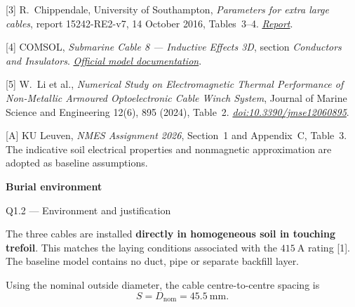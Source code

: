 \documentclass[11pt,a4paper]{article}
\newcommand{\source}[2]{\href{#1}{\textit{#2}}}
\begin{document}
[3] R.~Chippendale, University of Southampton, \textit{Parameters for extra large
cables}, report 15242-RE2-v7, 14 October 2016, Tables~3--4.
\source{https://www.transmissionexcel.com/wp-content/uploads/2016/11/Parameters-for-extra-large-cables-FINAL.pdf}{Report}.

[4] COMSOL, \textit{Submarine Cable 8 --- Inductive Effects 3D},
section \textit{Conductors and Insulators}.
\source{https://doc.comsol.com/6.4/doc/com.comsol.help.models.acdc.submarine_cable_08_inductive_effects_3d/submarine_cable_08_inductive_effects_3d.html}{Official model documentation}.

[5] W.~Li et al., \textit{Numerical Study on Electromagnetic Thermal Performance of
Non-Metallic Armoured Optoelectronic Cable Winch System},
Journal of Marine Science and Engineering 12(6), 895 (2024), Table~2.
\source{https://doi.org/10.3390/jmse12060895}{doi:10.3390/jmse12060895}.

[A] KU Leuven, \textit{NMES Assignment 2026}, Section~1 and Appendix~C, Table~3.
The indicative soil electrical properties and nonmagnetic approximation are
adopted as baseline assumptions.
\endgroup

\newpage
{\LARGE\bfseries Burial environment}\par
{\large Q1.2 --- Environment and justification}\par\medskip

The three cables are installed \textbf{directly in homogeneous soil in touching
trefoil}. This matches the laying conditions associated with the \(415~\mathrm{A}\)
rating [1]. The baseline model contains no duct, pipe or separate backfill layer.

\begin{center}
\end{center}
Using the nominal outside diameter, the cable centre-to-centre spacing is
\[
 S=D_{\mathrm{nom}}=45.5~\mathrm{mm}.
\]
\end{document}
